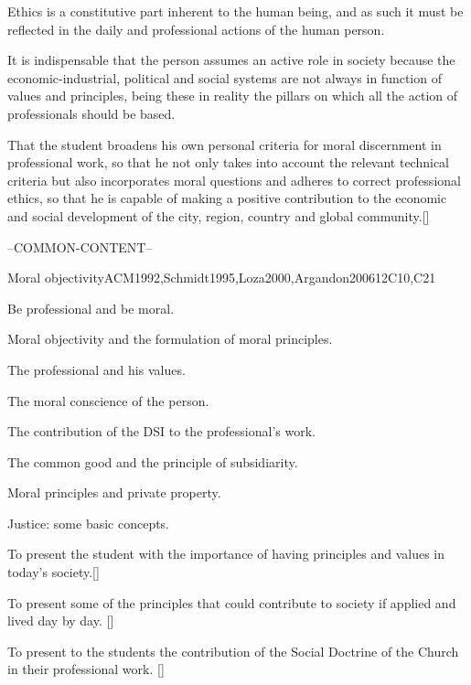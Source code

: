 \begin{syllabus}


\begin{justification}
Ethics is a constitutive part inherent to the human being, 
and as such it must be reflected in the daily and professional 
actions of the human person. 

It is indispensable that the person assumes an active role in 
society because the economic-industrial, political and social 
systems are not always in function of values and principles, 
being these in reality the pillars on which all the action of 
professionals should be based.
\end{justification}

\begin{goals}
\item That the student broadens his own personal criteria for moral discernment in professional work, so that he not only takes into account the relevant technical criteria but also incorporates moral questions and adheres to correct professional ethics, so that he is capable of making a positive contribution to the economic and social development of the city, region, country and global community.[\Usage]
\end{goals}

--COMMON-CONTENT--

\begin{unit}{}{Moral objectivity}{ACM1992,Schmidt1995,Loza2000,Argandon2006}{12}{C10,C21}
\begin{topics}
	\item Be professional and be moral.
	\item Moral objectivity and the formulation of moral principles.
	\item The professional and his values.
	\item The moral conscience of the person.
	\item The contribution of the DSI to the professional's work.
	\item The common good and the principle of subsidiarity.
	\item Moral principles and private property.
	\item Justice: some basic concepts.
\end{topics}
\begin{learningoutcomes}
	\item To present the student with the importance of having principles and values in today's society.[\Usage]
	\item To present some of the principles that could contribute to society if applied and lived day by day. [\Usage]
	\item To present to the students the contribution of the Social Doctrine of the Church in their professional work. [\Usage]
\end{learningoutcomes}
\end{unit}


\end{syllabus}

